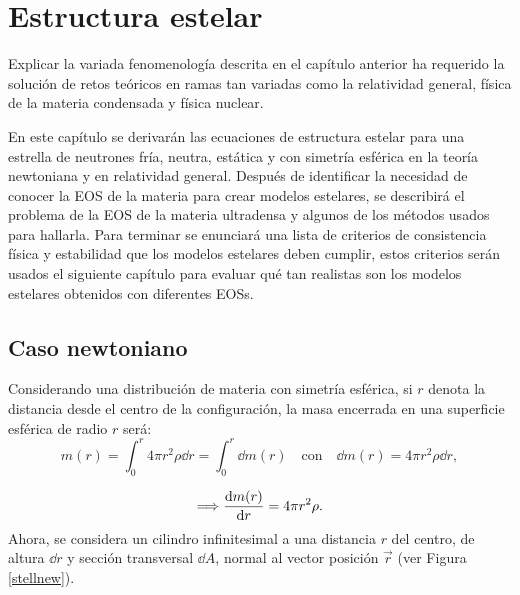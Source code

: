 \chapter{Estructura estelar}

Explicar la variada fenomenología descrita en el capítulo anterior ha requerido la solución de retos teóricos en ramas tan variadas como la relatividad general, física de la materia condensada y física nuclear. 

En este capítulo se derivarán las ecuaciones de estructura estelar para una estrella de neutrones fría, neutra, estática y con simetría esférica en la teoría newtoniana y en relatividad general. Después de identificar la necesidad de conocer la EOS de la materia para crear modelos estelares, se  describirá el problema de la EOS de la materia ultradensa y algunos de los métodos usados para hallarla.
Para terminar se enunciará una lista de criterios de consistencia física y estabilidad que los modelos estelares deben cumplir, estos criterios serán usados el siguiente capítulo para evaluar qué tan realistas son los modelos estelares obtenidos con diferentes EOSs.




\section{Caso newtoniano}

Considerando una distribución de materia con simetría esférica, si $r$ denota la distancia desde el centro de la configuración, la masa encerrada en una superficie esférica de radio $r$ será:  
\begin{equation}
    m ( r ) = \int _ { 0 } ^ { r } 4 \pi r ^ { 2 } \rho \dd{r} = \int_{0}^{r} \dd{m(r)} \quad\text{con}\quad \dd{m(r)}=4\pi r^2\rho \dd{r},
    \label{mN}
\end{equation}

\begin{equation}
    \Longrightarrow\dv{m(r)}{r} =4\pi r^2 \rho.
    \label{dmnewton}
\end{equation}
Ahora, se considera un cilindro infinitesimal a una distancia $r$ del centro, de altura $\dd{r}$ y sección transversal $\dd{A}$, normal al vector posición $\vec{r}$ (ver Figura \ref{stellnew}).  

